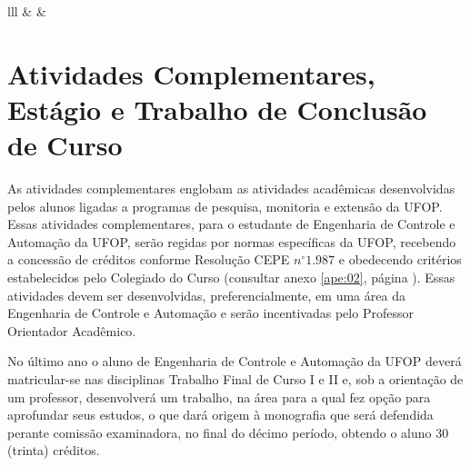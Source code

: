 \begin{table}[]
\begin{tabular}{lll}
			           &                       &                       \\ \hline
		\end{tabular}%
\end{table}

\section{Atividades Complementares, Estágio e Trabalho de Conclusão de Curso}
As atividades complementares englobam as atividades acadêmicas desenvolvidas pelos alunos ligadas a programas de pesquisa, monitoria e extensão da UFOP. Essas atividades complementares, para o estudante de Engenharia de Controle e Automação da UFOP, serão regidas por normas específicas da UFOP, recebendo a concessão de créditos conforme Resolução CEPE $n^{\circ} 1.987$ e obedecendo critérios estabelecidos pelo Colegiado do Curso (consultar anexo \ref{ape:02}, página \pageref{cepe1987}). Essas atividades devem ser desenvolvidas, preferencialmente, em uma área da Engenharia de Controle e Automação e serão incentivadas pelo Professor Orientador Acadêmico. 

No último ano o aluno de Engenharia de Controle e Automação da UFOP deverá matricular-se nas disciplinas Trabalho Final de Curso I e II e, sob a orientação de um professor, desenvolverá um trabalho, na área para a qual fez opção para aprofundar seus estudos, o que dará origem à monografia que será defendida perante comissão examinadora, no final do décimo período, obtendo o aluno 30 (trinta) créditos.